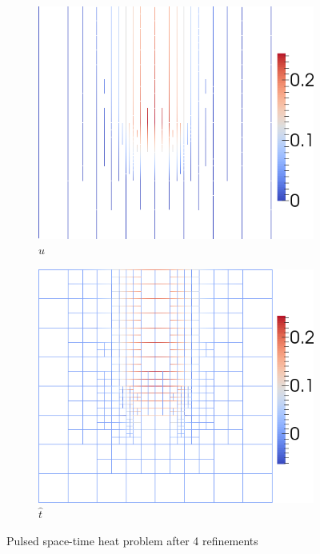 \documentclass[preprint,12pt]{elsarticle}
\begin{document}
\begin{figure}[p]
\begin{subfigure}[t]{0.45\textwidth}
\end{subfigure}
\begin{subfigure}[t]{0.45\textwidth}
\centering
\includegraphics[width=\textwidth]{SpaceTimeHeat/PulseSource/uhat.png}
\caption{$\hat u$}
\label{fig:spaceTimeHeatuhat}
\end{subfigure}
\begin{subfigure}[t]{0.45\textwidth}
\centering
\includegraphics[width=\textwidth]{SpaceTimeHeat/PulseSource/fhat.png}
\caption{$\hat t$}
\label{fig:spaceTimeHeatfhat}
\end{subfigure}
\caption{Pulsed space-time heat problem after 4 refinements}
\label{fig:spaceTimeHeatPulse}
\end{figure}
\end{document}

